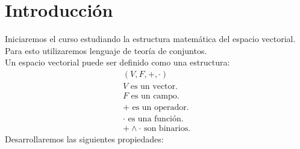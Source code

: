 





%

%

%
\onecolumn
\section*{Introducci\'{o}n}
Iniciaremos el curso estudiando la estructura matem\'{a}tica del  espacio vectorial.\\ Para esto utilizaremos lenguaje de teor\'{i}a de conjuntos.\\Un espacio vectorial puede ser definido como una estructura:
\begin{align*}
(V, F, +, \cdot)\\
V \text{ es un vector. }\\
F \text{ es un campo.}\\
+ \text{ es un operador.}\\
\cdot \text{ es una funci\'{o}n.}\\
+ \land \cdot \text{ son binarios.}
\end{align*}
Desarrollaremos las siguientes propiedades:

